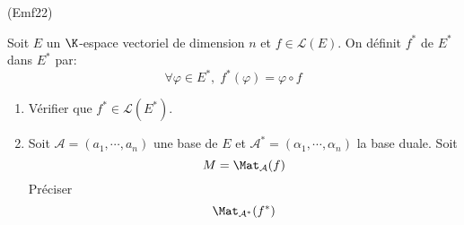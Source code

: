 \begin{tiny}(Emf22)\end{tiny} Soit $E$ un $\K$-espace vectoriel de dimension $n$ et $f\in \mathcal{L}(E)$. On définit $f^*$ de $E^*$ dans $E^*$ par:
\begin{displaymath}
  \forall \varphi \in E^*,\; f^*(\varphi) = \varphi \circ f
\end{displaymath}
\begin{enumerate}
  \item Vérifier que $f^*\in \mathcal{L}(E^*)$.
  \item Soit $\mathcal{A}=(a_1,\cdots,a_n)$ une base de $E$ et $\mathcal{A}^*=(\alpha_1,\cdots,\alpha_n)$ la base duale. Soit
\begin{displaymath}
  M = \Mat_{\mathcal{A}}(f)
\end{displaymath}
Préciser
\begin{displaymath}
  \Mat_{\mathcal{A}^*}(f^*)
\end{displaymath}
\end{enumerate}